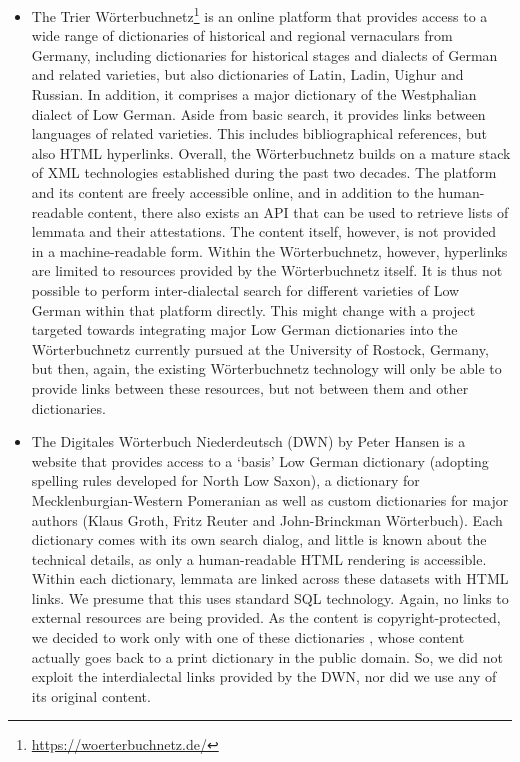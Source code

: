 \documentclass{article}
\begin{document}
\begin{itemize}
\item The Trier Wörterbuchnetz\footnote{\url{https://woerterbuchnetz.de/}} is an online platform that provides access to a wide range of dictionaries of historical and regional vernaculars from Germany, including dictionaries for historical stages and dialects of German and related varieties, but also dictionaries of Latin, Ladin, Uighur and Russian. In addition, it comprises a major dictionary of the Westphalian dialect of Low German. Aside from basic search, it provides links between languages of related varieties. This includes bibliographical references, but also HTML hyperlinks. Overall, the Wörterbuchnetz builds on a mature stack of XML technologies established during the past two decades. The platform and its content are freely accessible online, and in addition to the human-readable content, there also exists an API that can be used to retrieve lists of lemmata and their attestations. The content itself, however, is not provided in a machine-readable form. Within the Wörterbuchnetz, however, hyperlinks are limited to resources provided by the Wörterbuchnetz itself. It is thus not possible to perform inter-dialectal search for different varieties of Low German within that platform directly. This might change with a project targeted towards integrating major Low German dictionaries into the Wörterbuchnetz currently pursued at the University of Rostock, Germany, but then, again, the existing Wörterbuchnetz technology will only be able to provide links between these resources, but not between them and other dictionaries.
\item The Digitales Wörterbuch Niederdeutsch (DWN) by Peter Hansen is a website that provides access to a `basis' Low German dictionary (adopting spelling rules developed for North Low Saxon), a dictionary for Mecklenburgian-Western Pomeranian as well as custom dictionaries for major authors (Klaus Groth, Fritz Reuter and John-Brinckman Wörterbuch). Each dictionary comes with its own search dialog, and little is known about the technical details, as only a human-readable HTML rendering is accessible. Within each dictionary, lemmata are linked across these datasets with HTML links. We presume that this uses standard SQL technology. Again, no links to external resources are being provided.
As the content is copyright-protected, we decided to work only with one of these dictionaries \citep{muller1904reuter}, whose content actually goes back to a print dictionary in the public domain. So, we did not exploit the interdialectal links provided by the DWN, nor did we use any of its original content.

\end{itemize}
\end{document}

